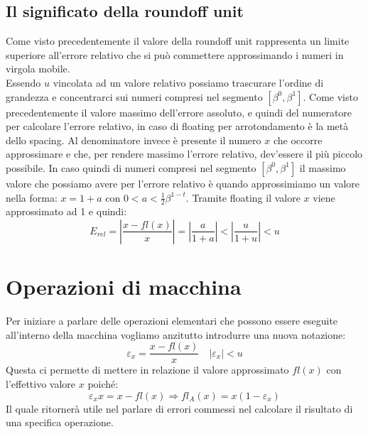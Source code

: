\documentclass[12pt, a4paper]{book}
\theoremstyle{definition}
\begin{document}
\subsection{Il significato della roundoff unit}
\begin{flushleft}
Come visto precedentemente il valore della roundoff unit rappresenta un limite superiore all'errore relativo che si può commettere approssimando i numeri in virgola mobile. \\
Essendo $u$ vincolata ad un valore relativo possiamo trascurare l'ordine di grandezza e concentrarci sui numeri compresi nel segmento $[\beta^{0}, \beta^{1}].$
Come visto precedentemente il valore massimo dell'errore assoluto, e quindi del numeratore per calcolare l'errore relativo,  in caso di floating per arrotondamento è la metà dello spacing.
Al denominatore invece è presente il numero $x$ che occorre approssimare e che,  per rendere massimo l'errore relativo, dev'essere il più piccolo possibile. 
In caso quindi di numeri compresi nel segmento $[\beta^{0}, \beta^{1}]$ il massimo valore che possiamo avere per l'errore relativo è quando approssimiamo un valore nella forma: $x = 1 + a$ con  $0 < a <  \frac{1}{2}\beta^{1-t}.$
Tramite floating il valore $x$ viene approssimato ad 1 e quindi:
\[
	E_{rel} = \displaystyle\left\lvert \frac{x - fl(x)}{x} \right\rvert = \displaystyle\left\lvert \frac{a}{1+a} \right\rvert < \displaystyle\left\lvert \frac{u}{1+u} \right\rvert < u 
\]
\end{flushleft}

\section{Operazioni di macchina}
\begin{flushleft}
Per iniziare a parlare delle operazioni elementari che possono essere eseguite all'interno della macchina vogliamo anzitutto introdurre una nuova notazione: 
\[ \varepsilon_{x} = \frac{x - fl(x)}{x} \quad |\varepsilon_{x}| < u \]
Questa ci permette di mettere in relazione il valore approssimato $fl(x)$ con l'effettivo valore $x$ poiché:
\[  \varepsilon_{x}x =  x - fl(x) \Longrightarrow fl_{A}(x) = x(1 - \varepsilon_{x}) \]
Il quale ritornerà utile nel parlare di errori commessi nel calcolare il risultato di una specifica operazione.
\end{flushleft}
\end{document}
